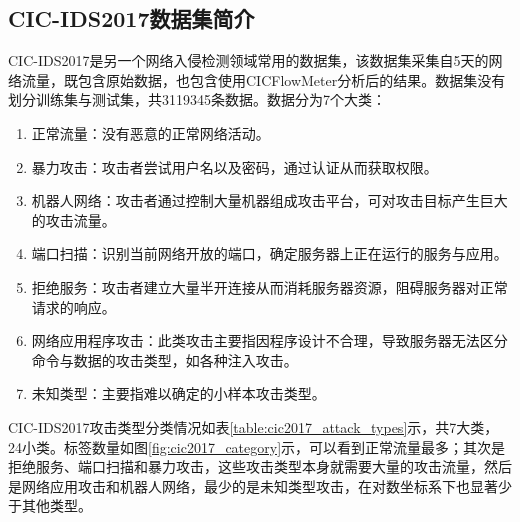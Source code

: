 \subsection{CIC-IDS2017数据集简介}
CIC-IDS2017是另一个网络入侵检测领域常用的数据集，该数据集采集自5天的网络流量，既包含原始数据，也包含使用CICFlowMeter分析后的结果。数据集没有划分训练集与测试集，共3119345条数据。数据分为7个大类：
\begin{enumerate}
\item 正常流量：没有恶意的正常网络活动。
\item 暴力攻击：攻击者尝试用户名以及密码，通过认证从而获取权限。
\item 机器人网络：攻击者通过控制大量机器组成攻击平台，可对攻击目标产生巨大的攻击流量。
\item 端口扫描：识别当前网络开放的端口，确定服务器上正在运行的服务与应用。
\item 拒绝服务：攻击者建立大量半开连接从而消耗服务器资源，阻碍服务器对正常请求的响应。
\item 网络应用程序攻击：此类攻击主要指因程序设计不合理，导致服务器无法区分命令与数据的攻击类型，如各种注入攻击。
\item 未知类型：主要指难以确定的小样本攻击类型。
\end{enumerate}

CIC-IDS2017攻击类型分类情况如表\ref{table:cic2017_attack_types}示，共7大类，24小类。标签数量如图\ref{fig:cic2017_category}示，可以看到正常流量最多；其次是拒绝服务、端口扫描和暴力攻击，这些攻击类型本身就需要大量的攻击流量，然后是网络应用攻击和机器人网络，最少的是未知类型攻击，在对数坐标系下也显著少于其他类型。

